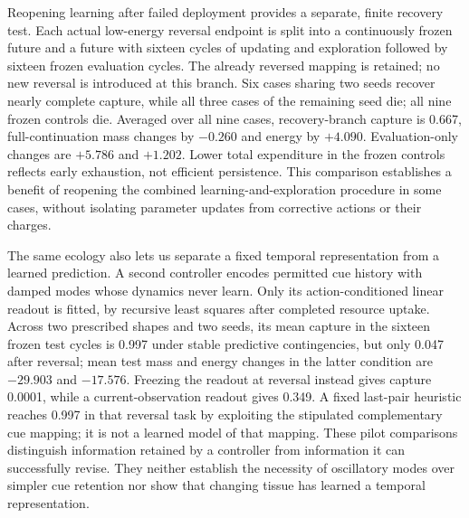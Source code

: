 Reopening learning after failed deployment provides a separate, finite recovery test. Each actual low-energy reversal endpoint is split into a continuously frozen future and a future with sixteen cycles of updating and exploration followed by sixteen frozen evaluation cycles. The already reversed mapping is retained; no new reversal is introduced at this branch. Six cases sharing two seeds recover nearly complete capture, while all three cases of the remaining seed die; all nine frozen controls die. Averaged over all nine cases, recovery-branch capture is 0.667, full-continuation mass changes by $-0.260$ and energy by $+4.090$. Evaluation-only changes are $+5.786$ and $+1.202$. Lower total expenditure in the frozen controls reflects early exhaustion, not efficient persistence. This comparison establishes a benefit of reopening the combined learning-and-exploration procedure in some cases, without isolating parameter updates from corrective actions or their charges.



The same ecology also lets us separate a fixed temporal representation from a learned prediction. A second controller encodes permitted cue history with damped modes whose dynamics never learn. Only its action-conditioned linear readout is fitted, by recursive least squares after completed resource uptake. Across two prescribed shapes and two seeds, its mean capture in the sixteen frozen test cycles is 0.997 under stable predictive contingencies, but only 0.047 after reversal; mean test mass and energy changes in the latter condition are $-29.903$ and $-17.576$. Freezing the readout at reversal instead gives capture 0.0001, while a current-observation readout gives 0.349. A fixed last-pair heuristic reaches 0.997 in that reversal task by exploiting the stipulated complementary cue mapping; it is not a learned model of that mapping. These pilot comparisons distinguish information retained by a controller from information it can successfully revise. They neither establish the necessity of oscillatory modes over simpler cue retention nor show that changing tissue has learned a temporal representation.

